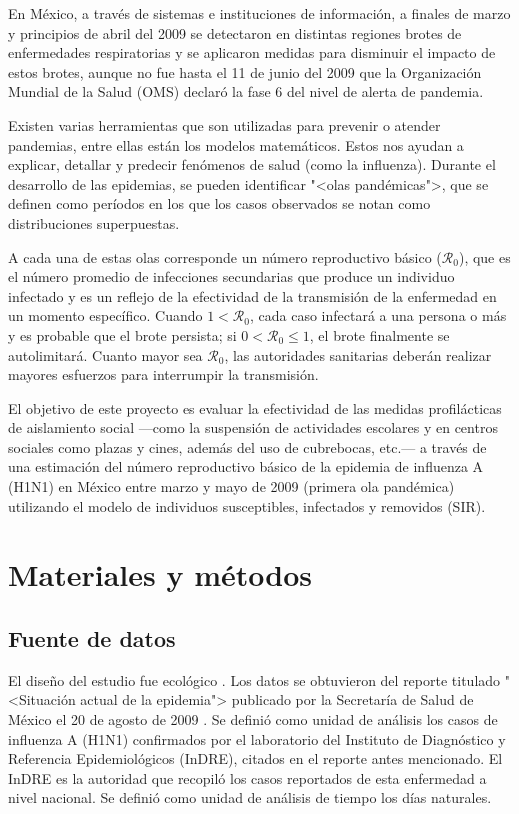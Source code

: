 \documentclass[12pt]{article}
\begin{document}
	En México, a través de sistemas e instituciones de información, a finales de marzo y principios de abril del 2009 se detectaron en distintas regiones brotes de enfermedades respiratorias y se aplicaron medidas para disminuir el impacto de estos brotes, aunque no fue hasta el 11 de junio del 2009 que la Organización Mundial de la Salud (OMS) declaró la fase 6 del nivel de alerta de pandemia.
	
	Existen varias herramientas que son utilizadas para prevenir o atender pandemias, entre ellas están los modelos matemáticos. Estos nos ayudan a explicar, detallar y predecir fenómenos de salud (como la influenza). Durante el desarrollo
	de las epidemias, se pueden identificar "<olas pandémicas">, que se definen como períodos en los que los casos observados se notan como distribuciones superpuestas.
	
	A cada una de estas olas corresponde un número reproductivo básico ($\mathcal{R}_0$), que es el número promedio de infecciones secundarias que produce un individuo infectado y es un reflejo de la efectividad de la transmisión de la enfermedad en un momento específico. Cuando $ 1 < \mathcal{R}_0 $, cada caso infectará a una persona o más y es
	probable que el brote persista; si $ 0 < \mathcal{R}_0 \leq 1 $, el brote finalmente se autolimitará. Cuanto mayor sea $ \mathcal{R}_0 $, las autoridades sanitarias deberán realizar mayores esfuerzos para interrumpir la transmisión.
	
	El objetivo de este proyecto es evaluar la efectividad de las medidas profilácticas de aislamiento social ---como la suspensión de actividades escolares y en centros sociales como plazas y cines, además del uso de cubrebocas, etc.---	a través de una estimación del número reproductivo básico de la epidemia de influenza A (H1N1) en México entre marzo y mayo de 2009 (primera ola pandémica) utilizando el modelo de individuos susceptibles, infectados y removidos (SIR).
	
	\section{Materiales y métodos}
	\subsection*{Fuente de datos}
	
	El diseño del estudio fue ecológico \cite{VillaRomero2012}. Los datos se obtuvieron del reporte titulado "<Situación actual de la epidemia"> publicado por la Secretaría de Salud de México el 20 de agosto de 2009 \cite{Salud2009}. Se definió como unidad de análisis los casos de influenza A (H1N1) confirmados por el laboratorio del Instituto de Diagnóstico y Referencia Epidemiológicos (InDRE), citados en el reporte antes mencionado. El InDRE es la autoridad que recopiló los casos reportados de esta enfermedad a nivel nacional. Se definió como unidad de análisis de tiempo los días naturales.
	
\end{document}
